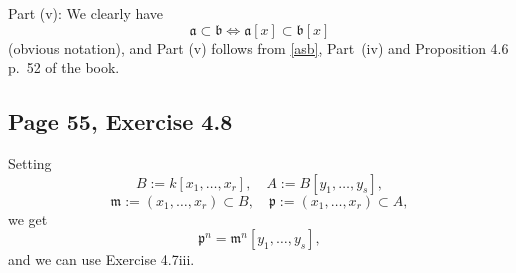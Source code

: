 \documentclass[parskip=half,fontsize=12pt]{scrartcl}%
\newcommand{\oo}{\operatorname}\newcommand{\ooo}{\operatorname*}
\newcommand{\mf}{\mathfrak}
\newcommand{\aaa}{\mf a}
\newcommand{\bbb}{\mf b}
\newcommand{\mmm}{\mf m}
\newcommand{\ppp}{\mf p}
\begin{document}
\begin{comment}
Part iv: We claim: %
\begin{equation}\label{acbx}
(\aaa\cap\bbb)[x]=\aaa[x]\cap\bbb[x]
\end{equation}
(obvious notation).

Proof: The diagram 
$$
\begin{tikzcd}
0\ar[r]&(\aaa\cap\bbb)[x]\ar[d]\ar[r]&(\aaa\oplus\bbb)[x]\ar[d]\ar[r]&(\aaa+\bbb)[x]\ar[d]\ar[r]&0\\ 
0\ar[r]&\aaa[x]\cap\bbb[x]\ar[r]&\aaa[x]\oplus\bbb[x]\ar[r]&\aaa[x]+\bbb[x]\ar[r]&0
\end{tikzcd}
$$ 
(where the arrows are the obvious ones) commutes, the rows are exact, the second vertical arrow is clearly an isomorphism, and the third vertical arrow is an isomorphism by Exercises 1.18 p.~10. Thus the first vertical arrow is also an isomorphism. But by its (implicit) definition this arrow is an inclusion. Being surjective, it is actually an equality. $\square$

Then Part (iv) follows from \eqref{acbx} and Part iii.
\end{comment}

Part (v): We clearly have 
\begin{equation}\label{asb}
\aaa\subset\bbb\iff\aaa[x]\subset\bbb[x]
\end{equation}
(obvious notation), and Part (v) follows from \eqref{asb}, Part~(iv) and Proposition 4.6 p.~52 of the book.

\subsection{Page 55, Exercise 4.8}%

Setting 
$$
B:=k[x_1,\dots,x_r],\quad A:=B[y_1,\dots,y_s],
$$ 
$$
\mmm:=(x_1,\dots,x_r)\subset B,\quad\ppp:=(x_1,\dots,x_r)\subset A,
$$ 
we get 
$$
\ppp^n=\mmm^n[y_1,\dots,y_s],
$$ 
and we can use Exercise 4.7iii.

%
\begin{comment}

Use Section \ref{5547} and the following easy fact:

Let $A$ be a ring and $x$ an indeterminate.


For $a$ in $A$ we have $(aA)[x]=a(A[x])$. (In fact for any overring $B$ of $A$ we have $(aA)^{\oo e}=aB$.) %
\end{comment}
%
\end{document}
